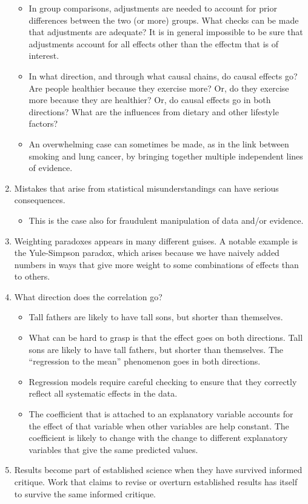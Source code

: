 \documentclass[
  10ptls,
  b5paper]{book}
\providecommand{\tightlist}{%
  \setlength{\itemsep}{0pt}\setlength{\parskip}{0pt}}
\begin{document}
\begin{enumerate}
  \begin{itemize}
  \tightlist
  \item
    In group comparisons, adjustments are needed
    to account for prior differences between the two (or more)
    groups. What checks can be made that adjustments are adequate?
    It is in general impossible to be sure that adjustments account
    for all effects other than the effectm that is of interest.
  \item
    In what direction, and through what causal chains, do causal
    effects go? Are people healthier because they exercise more?
    Or, do they exercise more because they are healthier? Or, do
    causal effects go in both directions? What are the influences
    from dietary and other lifestyle factors?
  \item
    An overwhelming case can sometimes be made, as in the link
    between smoking and lung cancer, by bringing together multiple
    independent lines of evidence.
  \end{itemize}
\item
  Mistakes that arise from statistical misunderstandings
  can have serious consequences.

  \begin{itemize}
  \tightlist
  \item
    This is the case also for fraudulent manipulation of
    data and/or evidence.
  \end{itemize}
\item
  Weighting paradoxes appears in many different guises.
  A notable example is the Yule-Simpson paradox, which arises
  because we have naively added numbers in ways that give more
  weight to some combinations of effects than to others.
\item
  What direction does the correlation go?

  \begin{itemize}
  \tightlist
  \item
    Tall fathers are likely to have tall sons, but shorter than themselves.
  \item
    What can be hard to grasp is that the effect goes on both directions.
    Tall sons are likely to have tall fathers, but shorter than themselves.
    The ``regression to the mean'' phenomenon goes in both directions.\\
  \item
    Regression models require careful checking to ensure that they
    correctly reflect all systematic effects in the data.
  \item
    The coefficient that is attached to an explanatory variable accounts
    for the effect of that variable when other variables are help constant.
    The coefficient is likely to change with the change to different
    explanatory variables that give the same predicted values.
  \end{itemize}
\item
  Results become part of established science when they have
  survived informed critique. Work that claims to revise or overturn
  established results has itself to survive the same informed critique.


\end{enumerate}
\end{document}
